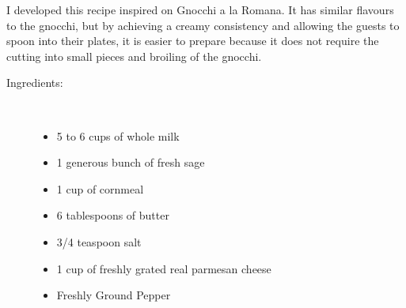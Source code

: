 \documentclass[11pt,letterpaper]{article}
\begin{document}


I developed this recipe inspired on Gnocchi a la Romana. It has similar flavours to the gnocchi, but by achieving a creamy consistency and allowing the guests to spoon into their plates, it is easier to prepare because it does not require the cutting into small pieces and broiling of the gnocchi.

\begin{description}

\item[Ingredients:]\ \\
	\begin{itemize}
	\item 5 to 6 cups of whole milk
	\item 1 generous bunch of fresh sage
	\item 1 cup of cornmeal 
	\item 6 tablespoons of butter
	\item 3/4 teaspoon salt
	\item 1 cup of freshly grated real parmesan cheese
	\item Freshly Ground Pepper
	\end{itemize}


\end{description}
\end{document}
